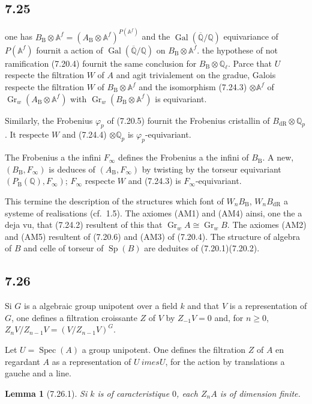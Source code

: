 \documentclass[12pt,a4paper]{article}
\theoremstyle{plain}
\newtheorem{lemma}[theorem]{Lemma}
\theoremstyle{definition}
\theoremstyle{remark}
\DeclareMathOperator{\Spec}{Spec}
\DeclareMathOperator{\Gal}{Gal}
\DeclareMathOperator{\Gr}{Gr}
\DeclareMathOperator{\Sp}{Sp}
\newcommand{\DR}{\mathrm{dR}}
\newcommand{\B}{\mathrm{B}}
\newcommand{\Q}{\mathbb{Q}}
\newcommand{\A}{\mathbb{A}}
\begin{document}
\subsection*{7.25}
one has $B_\B \otimes \A^f = (A_\B \otimes \A^f)^{P(\A^f)}$ and the $\Gal(\overline{\Q}/\Q)$ equivariance of $P(\A^f)$ fournit a action of $\Gal(\overline{\Q}/\Q)$ on $B_\B \otimes \A^f$. the hypothese of not ramification (7.20.4) fournit the same conclusion for $B_\B \otimes \Q_\ell$. Parce that $U$ respecte the filtration $W$ of $A$ and agit trivialement on the gradue, Galois respecte the filtration $W$ of $B_\B \otimes \A^f$ and the isomorphism (7.24.3) $\otimes \A^f$ of $\Gr_w(A_\B \otimes \A^f)$ with $\Gr_w(B_\B \otimes \A^f)$ is equivariant.

Similarly, the Frobenius $\varphi_p$ of (7.20.5) fournit the Frobenius cristallin of $B_\DR \otimes \Q_p$. It respecte $W$ and (7.24.4) $\otimes \Q_p$ is $\varphi_p$-equivariant.

The Frobenius a the infini $F_\infty$ defines the Frobenius a the infini of $B_\B$. A new, $(B_\B, F_\infty)$ is deduces of $(A_\B, F_\infty)$ by twisting by the torseur equivariant $(P_\B(\Q), F_\infty)$; $F_\infty$ respecte $W$ and (7.24.3) is $F_\infty$-equivariant.

This termine the description of the structures which font of $W_nB_\B$, $W_nB_\DR$ a systeme of realisations (cf.~1.5). The axiomes (AM1) and (AM4) ainsi, one the a deja vu, that (7.24.2) resultent of this that $\Gr_w A \cong \Gr_w B$. The axiomes (AM2) and (AM5) resultent of (7.20.6) and (AM3) of (7.20.4). The structure of algebra of $B$ and celle of torseur of $\Sp(B)$ are deduites of (7.20.1)(7.20.2).

\subsection*{7.26}
Si $G$ is a algebraic group unipotent over a field $k$ and that $V$ is a representation of $G$, one defines a filtration croissante $Z$ of $V$ by $Z_{-1}V = 0$ and, for $n \geq 0$, $Z_nV/Z_{n-1}V = (V/Z_{n-1}V)^G$.

Let $U = 
\Spec(A)$ a group unipotent. One defines the filtration $Z$ of $A$ en regardant $A$ as a representation of $U \	imes U$, for the action by translations a gauche and a line.

\begin{lemma}[7.26.1]\label{lem:7.26.1}
Si $k$ is of caracteristique $0$, each $Z_nA$ is of dimension finite.
\end{lemma}
\end{document}
